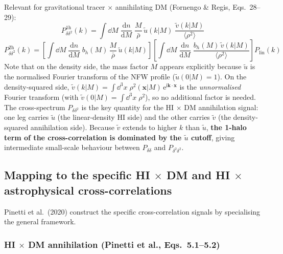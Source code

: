 \documentclass[10pt,a4paper]{article}
\newcommand{\vect}[1]{\mathbf{#1}}
\newcommand{\ddn}{\frac{\mathrm{d}n}{\mathrm{d}M}}
\newcommand{\rhobar}{\bar{\rho}}
\newcommand{\Plin}{P_{\mathrm{lin}}}
\newcommand{\utilde}{\tilde{u}}
\newcommand{\vtilde}{\tilde{v}}
\newcommand{\ee}{\mathrm{e}}
\newcommand{\ii}{\mathrm{i}}
\begin{document}
Relevant for gravitational tracer $\times$ annihilating DM (Fornengo \& Regis, Eqs.~28--29):
\begin{equation}
\label{eq:Pdd2_1h}
\boxed{
P_{\delta \delta^2}^{\mathrm{1h}}(k) = \int \dd M \; \ddn \; \frac{M}{\rhobar} \, \utilde(k | M) \; \frac{\vtilde(k | M)}{\langle \rho^2 \rangle}
}
\end{equation}
\begin{equation}
\label{eq:Pdd2_2h}
\boxed{
P_{\delta \delta^2}^{\mathrm{2h}}(k) = \left[\int \dd M \; \ddn \; b_h(M) \, \frac{M}{\rhobar} \, \utilde(k | M)\right] \left[\int \dd M \; \ddn \; \frac{b_h(M) \, \vtilde(k | M)}{\langle \rho^2 \rangle}\right] \Plin(k)
}
\end{equation}
Note that on the density side, the mass factor $M$ appears explicitly because $\utilde$ is the normalised Fourier transform of the NFW profile ($\utilde(0|M) = 1$). On the density-squared side, $\vtilde(k|M) = \int \dd^3 x \; \rho^2(\vect{x}|M) \, \ee^{\ii \vect{k} \cdot \vect{x}}$ is the \textit{unnormalised} Fourier transform (with $\vtilde(0|M) = \int \dd^3 x \; \rho^2$), so no additional factor is needed.
The cross-spectrum $P_{\delta \delta^2}$ is the key quantity for the HI $\times$ DM annihilation signal: one leg carries $\utilde$ (the linear-density HI side) and the other carries $\vtilde$ (the density-squared annihilation side). Because $\vtilde$ extends to higher $k$ than $\utilde$, \textbf{the 1-halo term of the cross-correlation is dominated by the $\utilde$ cutoff}, giving intermediate small-scale behaviour between $P_{\delta\delta}$ and $P_{\delta^2\delta^2}$.

\subsection{Mapping to the specific HI $\times$ DM and HI $\times$ astrophysical cross-correlations}

Pinetti et al.\ (2020) construct the specific cross-correlation signals by specialising the general framework.

\subsubsection{HI $\times$ DM annihilation (Pinetti et al., Eqs.~5.1--5.2)}
\end{document}
